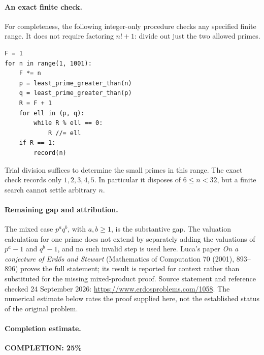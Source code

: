 \paragraph{An exact finite check.}
For completeness, the following integer-only procedure checks any specified finite range. It does not require factoring \(n!+1\): divide out just the two allowed primes.
\begin{verbatim}
F = 1
for n in range(1, 1001):
    F *= n
    p = least_prime_greater_than(n)
    q = least_prime_greater_than(p)
    R = F + 1
    for ell in (p, q):
        while R % ell == 0:
            R //= ell
    if R == 1:
        record(n)
\end{verbatim}
Trial division suffices to determine the small primes in this range. The exact check records only \(1,2,3,4,5\). In particular it disposes of \(6\leq n<32\), but a finite search cannot settle arbitrary \(n\).

\paragraph{Remaining gap and attribution.}
The mixed case \(p^a q^b\), with \(a,b\geq1\), is the substantive gap. The valuation calculation for one prime does not extend by separately adding the valuations of \(p^a-1\) and \(q^b-1\), and no such invalid step is used here. Luca's paper \emph{On a conjecture of Erd\H{o}s and Stewart} (Mathematics of Computation 70 (2001), 893--896) proves the full statement; its result is reported for context rather than substituted for the missing mixed-product proof. Source statement and reference checked 24 September 2026: \url{https://www.erdosproblems.com/1058}. The numerical estimate below rates the proof supplied here, not the established status of the original problem.

\paragraph{Completion estimate.}
\textbf{COMPLETION: 25\%}
